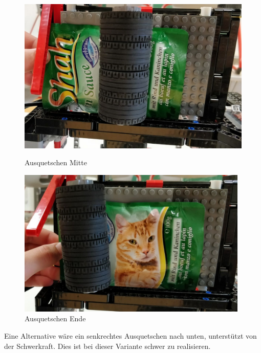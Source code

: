 \begin{figure}[H]
   \begin{minipage}[hbt]{0.5\textwidth} %
      \includegraphics[width=1\textwidth]{Bilder/Ablauf_1_png/Ausquetschen_2}
      \caption{Ausquetschen Mitte}
      \label{Ausquetschen Mitte}
   \end{minipage}
   \hspace{.04\linewidth}%
   \begin{minipage}[hbt]{0.5\textwidth} %
      \includegraphics[width=0.98\textwidth]{Bilder/Ablauf_1_png/Ausquetschen_3}
      \caption{Ausquetschen Ende}
	  \label{Ausquetschen Ende}      
      \end{minipage}
\end{figure}

Eine Alternative wäre ein senkrechtes Ausquetschen nach unten, unterstützt von der Schwerkraft. Dies ist bei dieser Variante schwer zu realisieren.


